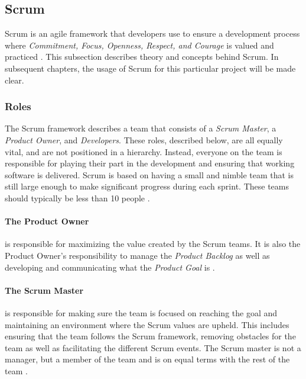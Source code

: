 \subsection{Scrum} \label{sub:scrum}
Scrum is an agile framework that developers use to ensure a development process where \emph{Commitment, Focus, Openness, Respect, and Courage} is valued and practiced \cite{schwaber_sutherland_2022}. 
This subsection describes theory and concepts behind Scrum.
In subsequent chapters, the usage of Scrum for this particular project will be made clear.


\subsubsection{Roles}
The Scrum framework describes a team that consists of a \emph{Scrum Master}, a \emph{Product Owner}, and \emph{Developers}. 
These roles, described below, are all equally vital, and are not positioned in a hierarchy. 
Instead, everyone on the team is responsible for playing their part in the development and ensuring that working software is delivered. 
Scrum is based on having a small and nimble team that is still large enough to make significant progress during each sprint.
These teams should typically be less than 10 people \cite{schwaber_sutherland_2022}.

\paragraph{The Product Owner}
is responsible for maximizing the value created by the Scrum teams. 
It is also the Product Owner's responsibility to manage the \emph{Product Backlog} as well as developing and communicating what the \emph{Product Goal} is \cite{schwaber_sutherland_2022}. 

\paragraph{The Scrum Master}
is responsible for making sure the team is focused on reaching the goal and maintaining an environment where the Scrum values are upheld. This includes ensuring that the team follows the Scrum framework, removing obstacles for the team as well as facilitating the different Scrum events.
The Scrum master is not a manager, but a member of the team and is on equal terms with the rest of the team \cite{schwaber_sutherland_2022}.
 
